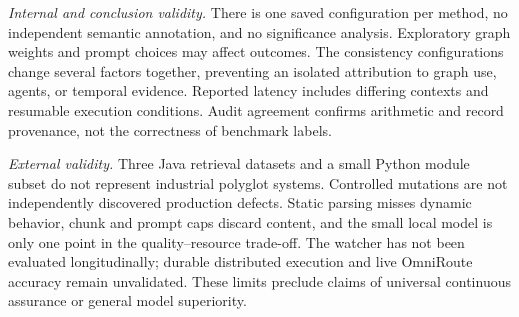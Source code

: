 \documentclass[conference,letterpaper,10pt]{IEEEtran}
\begin{document}
\textit{Internal and conclusion validity.} There is one saved configuration per method, no independent semantic annotation, and no significance analysis. Exploratory graph weights and prompt choices may affect outcomes. The consistency configurations change several factors together, preventing an isolated attribution to graph use, agents, or temporal evidence. Reported latency includes differing contexts and resumable execution conditions. Audit agreement confirms arithmetic and record provenance, not the correctness of benchmark labels.

\textit{External validity.} Three Java retrieval datasets and a small Python module subset do not represent industrial polyglot systems. Controlled mutations are not independently discovered production defects. Static parsing misses dynamic behavior, chunk and prompt caps discard content, and the small local model is only one point in the quality--resource trade-off. The watcher has not been evaluated longitudinally; durable distributed execution and live OmniRoute accuracy remain unvalidated. These limits preclude claims of universal continuous assurance or general model superiority.
\end{document}
